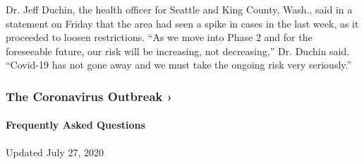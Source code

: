 Dr. Jeff Duchin, the health officer for Seattle and King County, Wash.,
said in a statement on Friday that the area had seen a spike in cases in
the last week, as it proceeded to loosen restrictions. ``As we move into
Phase 2 and for the foreseeable future, our risk will be increasing, not
decreasing,'' Dr. Duchin said. ``Covid-19 has not gone away and we must
take the ongoing risk very seriously.''

\href{https://www.nytimes.com/news-event/coronavirus?action=click\&pgtype=Article\&state=default\&region=MAIN_CONTENT_3\&context=storylines_faq}{}

\hypertarget{the-coronavirus-outbreak-}{%
\subsubsection{The Coronavirus Outbreak
›}\label{the-coronavirus-outbreak-}}

\hypertarget{frequently-asked-questions}{%
\paragraph{Frequently Asked
Questions}\label{frequently-asked-questions}}

Updated July 27, 2020

